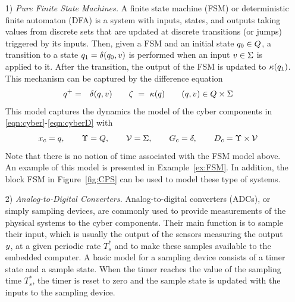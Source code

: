 \documentclass{article}
\begin{document}
\begin{enumerate}
\item[1)] {\em Pure Finite State Machines.}
A finite state machine (FSM) or deterministic finite automaton (DFA) is a system with
inputs, states, and outputs taking values from discrete sets that are updated at discrete transitions (or jumps)
triggered by its inputs. 
Then, given a FSM and an initial state $q_0 \in Q$,  
a transition to a state $q_1 = \delta(q_0,v)$ is performed
when an input $v \in \Sigma$ is applied to it.
After the transition, the output of the FSM is updated to $\kappa(q_1)$.
This mechanism can be captured by the difference equation
\begin{eqnarray}\label{eqn:FSMmodel}
\xlogic^+ & = & \delta(\xlogic,\uc)  \qquad \yc \ = \ \hc(\xlogic) \qquad (\xlogic,\uc)  \in \xlogicSpace \times \Sigma
\end{eqnarray}
This model captures the dynamics
the model of the cyber components 
in \eqref{eqn:cyber}-\eqref{eqn:cyberD}
with
$$
x_c = q, \qquad \Upsilon = Q, \qquad {\cal V} = \Sigma, \qquad G_c = \delta, \qquad D_c = \Upsilon\times{\cal V}
$$
Note that there is no notion of time associated with the FSM model above. An example of this model is presented in Example~\ref{ex:FSM}. In addition, the block FSM in Figure~\ref{fig:CPS} can be used to model these type of systems.
\medskip

\item[2)] {\em Analog-to-Digital Converters.}
Analog-to-digital converters (ADCs),  or simply sampling devices,
are commonly used to provide measurements of the physical systems
to the cyber components. Their main
function is to sample their input, which is usually the output of the sensors measuring
the output $y$, at a given periodic rate $T^*_s$ and to make these samples
available to the embedded computer. A basic model for a sampling device
consists of a timer state and a sample state.  When the timer reaches
the value of the sampling time $T^*_s$, the timer is reset to zero and
the sample state is updated with the inputs to the sampling device. 


\end{enumerate}
\end{document}

